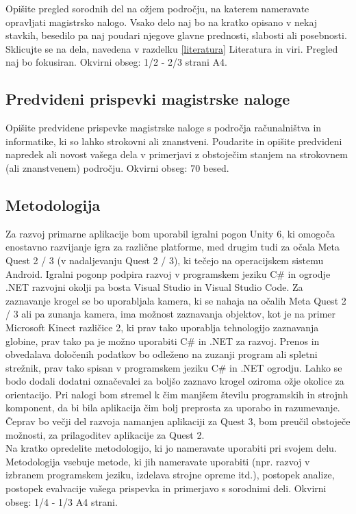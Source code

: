 \documentclass[a4paper, 12pt]{article}
\newcommand\cmnt[1]{\textcolor{munsell}{#1}}
\begin{document}
\cmnt{Opišite pregled sorodnih del na ožjem področju, na katerem nameravate opravljati magistrsko nalogo. Vsako delo naj bo na kratko opisano v nekaj stavkih, besedilo pa naj poudari njegove glavne prednosti, slabosti ali posebnosti. Sklicujte se na dela, navedena v razdelku \ref{literatura} Literatura in viri. Pregled naj bo fokusiran.  Okvirni obseg: 1/2 - 2/3 strani A4.}

\subsection{Predvideni prispevki magistrske naloge}

\cmnt{Opišite predvidene prispevke magistrske naloge s področja računalništva in informatike, ki so lahko strokovni ali znanstveni. Poudarite in opišite predvideni napredek ali novost vašega dela v primerjavi z obstoječim stanjem na strokovnem (ali znanstvenem) področju.  Okvirni obseg: 70 besed.}


\subsection{Metodologija}

Za razvoj primarne aplikacije bom uporabil igralni pogon Unity 6, ki omogoča enostavno
razvijanje igra za različne platforme, med drugim tudi za očala Meta Quest 2 / 3 (v nadaljevanju Quest 2 / 3), ki tečejo na
operacijskem sistemu Android. Igralni pogonp podpira razvoj v programskem jeziku C\# in
ogrodje .NET razvojni okolji pa bosta Visual Studio in Visual Studio Code. Za zaznavanje krogel
se bo uporabljala kamera, ki se nahaja na očalih Meta Quest 2 / 3 ali pa zunanja kamera, ima možnost
zaznavanja objektov, kot je na primer Microsoft Kinect različice 2, ki prav tako uporablja
tehnologijo zaznavanja globine, prav tako pa je možno uporabiti C\# in .NET za razvoj. Prenos in
obvedalava določenih podatkov bo odleženo na zuzanji program ali spletni strežnik, prav tako 
spisan v programskem jeziku C\# in .NET ogrodju. Lahko se bodo dodali dodatni označevalci za 
boljšo zaznavo krogel oziroma ožje okolice za orientacijo. Pri nalogi bom stremel k čim manjšem
številu programskih in strojnh komponent, da bi bila aplikacija čim bolj preprosta za uporabo in razumevanje.
Čeprav bo večji del razvoja namanjen aplikaciji za Quest 3, bom preučil obstoječe možnosti, za prilagoditev aplikacije za 
Quest 2.
 \\
\cmnt{Na kratko opredelite metodologijo, ki jo nameravate uporabiti pri svojem delu. Metodologija vsebuje metode, ki jih nameravate uporabiti (npr. razvoj v izbranem programskem jeziku, izdelava strojne opreme itd.), postopek analize, postopek evalvacije vašega prispevka in primerjavo s sorodnimi deli.  Okvirni obseg: 1/4 - 1/3 A4 strani.}
\end{document}
